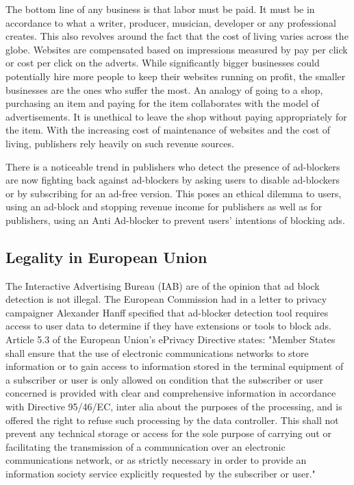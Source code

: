 \documentclass[runningheads,a4paper]{llncs}
\begin{document}
The bottom line of any business is that labor must be paid. It must be in accordance to what a writer, producer, musician, developer or any professional creates. This also revolves around the fact that the cost of living varies across the globe. Websites are compensated based on impressions measured by pay per click or cost per click on the adverts. While significantly bigger businesses could potentially hire more people to keep their websites running on profit, the smaller businesses are the ones who suffer the most. An analogy of going to a shop, purchasing an item and paying for the item collaborates with the model of advertisements. It is unethical to leave the shop without paying appropriately for the item. With the increasing cost of maintenance of websites and the cost of living, publishers rely heavily on such revenue sources.

There is a noticeable trend in publishers who detect the presence of ad-blockers are now fighting back against ad-blockers by asking users to disable ad-blockers or by subscribing for an ad-free version. This poses an ethical dilemma to users, using an ad-block and stopping revenue income for publishers as well as for publishers, using an Anti Ad-blocker to prevent users' intentions of blocking ads.

\subsection{Legality in European Union}

The Interactive Advertising Bureau (IAB) are of the opinion that ad block detection is not illegal. The European Commission had in a letter to privacy campaigner Alexander Hanff \cite{euHanff} specified that ad-blocker detection tool requires access to user data to determine if they have extensions or tools to block ads. Article 5.3 of the European Union's ePrivacy Directive \cite{eprivacy} states: "Member States shall ensure that the use of electronic communications networks to store information or to gain access to information stored in the terminal equipment of a subscriber or user is only allowed on condition that the subscriber or user concerned is provided with clear and comprehensive information in accordance with Directive 95/46/EC, inter alia about the purposes of the processing, and is offered the right to refuse such processing by the data controller. This shall not prevent any technical storage or access for the sole purpose of carrying out or facilitating the transmission of a communication over an electronic communications network, or as strictly necessary in order to provide an information society service explicitly requested by the subscriber or user."
\end{document}
